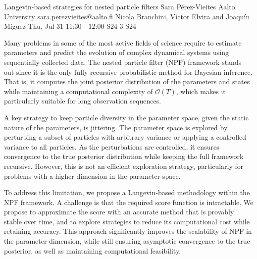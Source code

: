 \begin{talk}
  {Langevin-based strategies for nested particle filters}%
  {Sara P\'erez-Vieites}%
  {Aalto University}%
  {sara.perezvieites@aalto.fi}%
  {Nicola Branchini, V\'ictor Elvira and Joaqu\'in M\'iguez}%
  {}%
  {Thu, Jul 31 11:30---12:00}%
  {S24-3}%
  {S24}%
  
    
   
Many problems in some of the most active fields of science require to estimate parameters and predict the evolution of complex dynamical systems using sequentially collected data. The nested particle filter (NPF) framework stands out since it is the only fully recursive probabilistic method for Bayesian inference. That is, it computes the joint posterior distribution of the parameters and states while maintaining a computational complexity of $\mathcal{O}(T)$, which makes it particularly suitable for long observation sequences. 

A key strategy to keep particle diversity in the parameter space, given the static nature of the parameters, is jittering. The parameter space is explored by perturbing a subset of particles with arbitrary variance or applying a controlled variance to all particles. As the perturbations are controlled, it ensures convergence to the true posterior distribution while keeping the full framework recursive. However, this is not an efficient exploration strategy, particularly for problems with a higher dimension in the parameter space.

To address this limitation, we propose a Langevin-based methodology within the NPF framework. A challenge is that the required score function is intractable. We propose to approximate the score with an accurate method that is provably stable over time, and to explore strategies to reduce its computational cost while retaining accuracy.
This approach significantly improves the scalability of NPF in the parameter dimension, while still ensuring asymptotic convergence to the true posterior, as well as maintaining computational feasibility.

\medskip




\end{talk}
